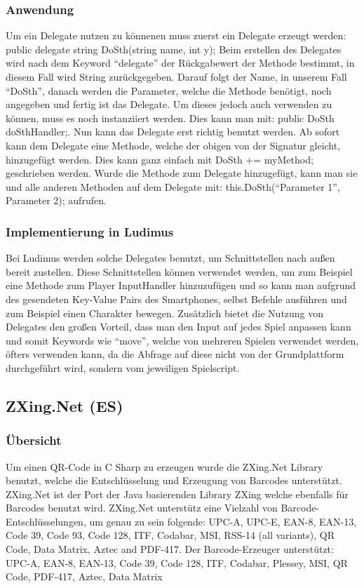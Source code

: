 \subsubsection{Anwendung}
Um ein Delegate nutzen zu könnenen muss zuerst ein Delegate erzeugt werden:
\newline
\tab public delegate string DoSth(string name, int y);
\newline
Beim erstellen des Delegates wird nach dem Keyword “delegate” der Rückgabewert der Methode bestimmt, in diesem Fall wird String zurückgegeben. Darauf folgt der Name, in unserem Fall “DoSth”, danach werden die Parameter, welche die Methode benötigt, noch angegeben und fertig ist das Delegate. Um dieses jedoch auch verwenden zu können, muss es noch instanziiert werden. Dies kann man mit: public DoSth doSthHandler;. Nun kann das Delegate erst richtig benutzt werden. Ab sofort kann dem Delegate eine Methode, welche der obigen von der Signatur gleicht, hinzugefügt werden. Dies kann ganz einfach mit DoSth += myMethod; geschrieben werden. Wurde die Methode zum Delegate hinzugefügt, kann man sie und alle anderen Methoden auf dem Delegate mit: this.DoSth(“Parameter 1”, Parameter 2); aufrufen.
\subsubsection{Implementierung in Ludimus}
Bei Ludimus werden solche Delegates benutzt, um Schnittstellen nach außen bereit zustellen. Diese Schnittstellen können verwendet werden, um zum Beispiel eine Methode zum Player InputHandler hinzuzufügen und so kann man aufgrund des gesendeten Key-Value Pairs des Smartphones, selbst Befehle ausführen und zum Beispiel einen Charakter bewegen. Zusätzlich bietet die Nutzung von Delegates den großen Vorteil, dass man den Input auf jedes Spiel anpassen kann und somit Keywords wie “move”, welche von mehreren Spielen verwendet werden, öfters verwenden kann, da die Abfrage auf diese nicht von der Grundplattform durchgeführt wird, sondern vom jeweiligen Spielscript.
\subsection{ZXing.Net (ES)}
\subsubsection{Übersicht}
Um einen QR-Code in C Sharp zu erzeugen wurde die ZXing.Net Library benutzt, welche die Entschlüsselung und Erzeugung von Barcodes unterstützt. ZXing.Net ist der Port der Java basierenden Library ZXing welche ebenfalls für Barcodes benutzt wird.
\newline \newline
ZXing.Net unterstütz eine Vielzahl von Barcode-Entschlüsselungen, um genau zu sein folgende: UPC-A, UPC-E, EAN-8, EAN-13, Code 39, Code 93, Code 128, ITF, Codabar, MSI, RSS-14 (all variants), QR Code, Data Matrix, Aztec and PDF-417.
\newline \newline
Der Barcode-Erzeuger unterstützt: UPC-A, EAN-8, EAN-13, Code 39, Code 128, ITF, Codabar, Plessey, MSI, QR Code, PDF-417, Aztec, Data Matrix
